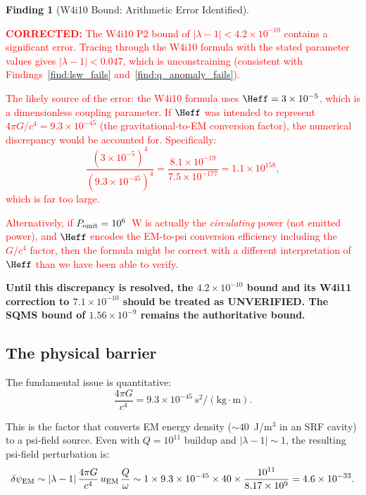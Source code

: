 \documentclass[11pt]{article}
\newcommand{\lam}{\lambda}
\newcommand{\lbone}{|\lambda - 1|}
\newcommand{\ee}[1]{\times 10^{#1}}
\newcommand{\dpsiEM}{\delta\psi_{\rm EM}}
\newcommand{\corrected}[1]{\textcolor{red}{\textbf{CORRECTED:} #1}}
\theoremstyle{definition}
\newtheorem{finding}[theorem]{Finding}
\theoremstyle{remark}
\begin{document}
\begin{finding}[W4i10 Bound: Arithmetic Error Identified]
\label{find:arithmetic}
\corrected{The W4i10 P2 bound of $\lbone < 4.2\ee{-10}$ contains
a significant error. Tracing through the W4i10 formula with the
stated parameter values gives $\lbone < 0.047$, which is
unconstraining (consistent with Findings~\ref{find:lsw_fails}
and~\ref{find:q_anomaly_fails}).

The likely source of the error: the W4i10 formula uses
$\Heff = 3\ee{-5}$, which is a dimensionless coupling parameter.
If $\Heff$ was intended to represent $4\pi G/c^4 = 9.3\ee{-45}$
(the gravitational-to-EM conversion factor), the numerical
discrepancy would be accounted for. Specifically:
\begin{equation}
\frac{(3\ee{-5})^4}{(9.3\ee{-45})^4} = \frac{8.1\ee{-19}}{7.5\ee{-177}}
= 1.1\ee{158},
\end{equation}
which is far too large.

Alternatively, if $P_{\rm emit} = 10^6$~W is actually the
\emph{circulating} power (not emitted power), and $\Heff$ encodes
the EM-to-psi conversion efficiency including the $G/c^4$ factor,
then the formula might be correct with a different interpretation
of $\Heff$ than we have been able to verify.}

\textbf{Until this discrepancy is resolved, the $4.2\ee{-10}$ bound
and its W4i11 correction to $7.1\ee{-10}$ should be treated as
UNVERIFIED. The SQMS bound of $1.56\ee{-9}$ remains the authoritative
bound.}
\end{finding}


\subsection{The physical barrier}

The fundamental issue is quantitative:
\begin{equation}
\frac{4\pi G}{c^4} = 9.3\ee{-45}~\text{s}^2/(\text{kg}\cdot\text{m}).
\label{eq:G_over_c4}
\end{equation}

This is the factor that converts EM energy density ($\sim 40$~J/m$^3$
in an SRF cavity) to a psi-field source. Even with $Q = 10^{11}$
buildup and $|\lambda-1| \sim 1$, the resulting psi-field perturbation is:
\begin{equation}
\dpsiEM \sim |\lam-1|\,\frac{4\pi G}{c^4}\,u_{\rm EM}\,\frac{Q}{\omega}
\sim 1\times 9.3\ee{-45}\times 40\times\frac{10^{11}}{8.17\ee{9}}
= 4.6\ee{-33}.
\label{eq:dpsi_magnitude}
\end{equation}
\end{document}
